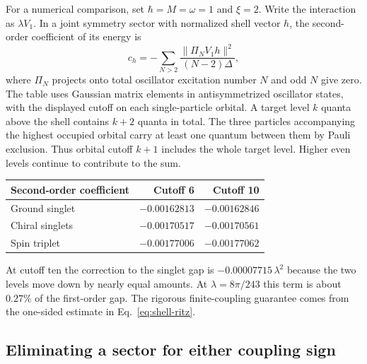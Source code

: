 \documentclass[11pt]{article}
\theoremstyle{definition}
\begin{document}
For a numerical comparison, set $\hbar=M=\omega=1$ and $\xi=2$. Write the interaction as $\lambda V_1$. In a joint symmetry sector with normalized shell vector $h$, the second-order coefficient of its energy is
\begin{equation}
 c_h=-\sum_{N>2}
 \frac{\|\Pi_N V_1h\|^2}{(N-2)\Delta},
 \label{eq:orbital-second-order}
\end{equation}
where $\Pi_N$ projects onto total oscillator excitation number $N$ and odd $N$ give zero. The table uses Gaussian matrix elements in antisymmetrized oscillator states, with the displayed cutoff on each single-particle orbital. A target level $k$ quanta above the shell contains $k+2$ quanta in total. The three particles accompanying the highest occupied orbital carry at least one quantum between them by Pauli exclusion. Thus orbital cutoff $k+1$ includes the whole target level. Higher even levels continue to contribute to the sum.
\begin{center}
\begin{tabular}{lrr}
\toprule
Second-order coefficient & Cutoff 6 & Cutoff 10\\
\midrule
Ground singlet & $-0.00162813$ & $-0.00162846$\\
Chiral singlets & $-0.00170517$ & $-0.00170561$\\
Spin triplet & $-0.00177006$ & $-0.00177062$\\
\bottomrule
\end{tabular}
\end{center}
At cutoff ten the correction to the singlet gap is $-0.00007715\,\lambda^2$ because the two levels move down by nearly equal amounts. At $\lambda=8\pi/243$ this term is about $0.27\%$ of the first-order gap. The rigorous finite-coupling guarantee comes from the one-sided estimate in Eq.~\eqref{eq:shell-ritz}.

\subsection{Eliminating a sector for either coupling sign}
\label{subsec:signed-reduction}
\end{document}
